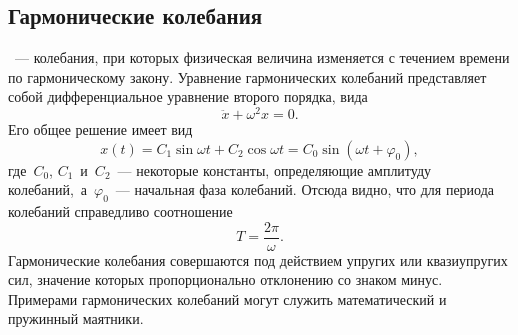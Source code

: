 \subsection{Гармонические колебания}
~--- колебания, при которых физическая величина изменяется с течением времени по гармоническому закону. Уравнение гармонических колебаний представляет собой дифференциальное уравнение второго порядка, вида
\begin{equation}
\ddot{x} + \omega^2 x = 0.
\end{equation}
Его общее решение имеет вид
\begin{equation}
	x(t) = C_1 \sin \omega t + C_2 \cos \omega t = C_0 \sin (\omega t + \varphi_0),
\end{equation}
где~$C_0$, $C_1$~и~$C_2$~--- некоторые константы, определяющие амплитуду колебаний,~а~$\varphi_0$~--- начальная фаза колебаний. Отсюда видно, что для периода колебаний справедливо соотношение
\begin{equation}
T = \frac{2 \pi}{\omega}.
\end{equation}
Гармонические колебания совершаются под действием упругих или квазиупругих сил, значение которых пропорционально отклонению со знаком минус. Примерами гармонических колебаний могут служить математический и пружинный маятники.